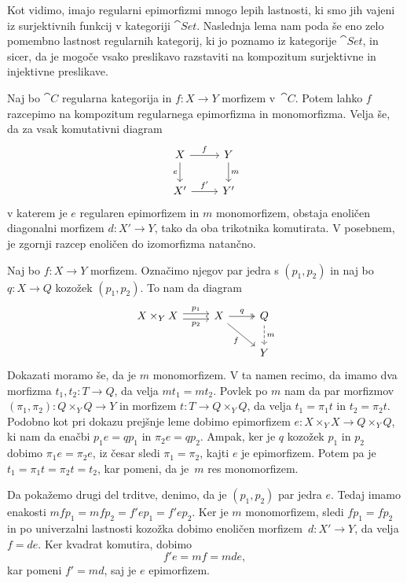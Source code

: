 \documentclass[../kategoricna_logika.tex]{subfiles}
\begin{document}
Kot vidimo, imajo regularni epimorfizmi mnogo lepih lastnosti, ki smo
jih vajeni iz surjektivnih funkcij v kategoriji $\cat{Set}$.
Naslednja lema nam poda še eno zelo pomembno lastnost regularnih
kategorij, ki jo poznamo iz kategorije $\cat{Set}$, in sicer, da je
mogoče vsako preslikavo razstaviti na kompozitum surjektivne in
injektivne preslikave.
\begin{lema}
  Naj bo $\cat{C}$ regularna kategorija in $f: X \to Y$ morfizem
  v~$\cat{C}$.  Potem lahko $f$ razcepimo na kompozitum regularnega
  epimorfizma in monomorfizma.  Velja še, da za vsak komutativni
  diagram
  \begin{equation*}
    \begin{tikzcd}
      X \ar[d, "e"'] \ar[r, "f"] & Y \ar[d, "m"] \\
      X' \ar[r, "f'"] & Y'
    \end{tikzcd}
  \end{equation*}
  v katerem je $e$ regularen epimorfizem in $m$ monomorfizem, obstaja
  enoličen diagonalni morfizem $d : X' \to Y$, tako da oba trikotnika
  komutirata.  V posebnem, je zgornji razcep enoličen do izomorfizma
  natančno.
\end{lema}
\begin{comment}
  \begin{opomba}
    Pokažimo, da zgornja trditev res pomeni, da so slike morfizmov
    enolične.
  \end{opomba}
\end{comment}
\begin{dokaz}
  Naj bo $f : X \to Y$ morfizem.  Označimo njegov par jedra s
  $(p_1, p_2)$ in naj bo$q : X \to Q$ kozožek $(p_1, p_2)$.  To nam da
  diagram
  \begin{equation*}
    \begin{tikzcd}
      X \times_Y X \ar[r, shift left, "p_1"] \ar[r, shift right,
      "p_2"'] &
      X \ar[dr, "f"'] \ar[r, two heads, "q"] & Q \ar[d, dashed, "m"] \\
      & & Y
    \end{tikzcd}
  \end{equation*}
  Dokazati moramo še, da je $m$ monomorfizem. V ta namen recimo, da
  imamo dva morfizma $t_1, t_2 : T \to Q$, da velja $m t_1 = m
  t_2$. Povlek po $m$ nam da par morfizmov
  $(\pi_1, \pi_2) : Q \times_Y Q \to Y$ in morfizem
  $t : T \to Q \times_Y Q$, da velja $t_1 = \pi_1 t$ in
  $t_2 = \pi_2 t$.  Podobno kot pri dokazu prejšnje leme dobimo
  epimorfizem $e : X \times_Y X \to Q \times_Y Q$, ki nam da enačbi
  $p_1 e = q p_1$ in $\pi_2 e = q p_2$.  Ampak, ker je $q$ kozožek
  $p_1$ in $p_2$ dobimo $\pi_1 e = \pi_2 e$, iz česar sledi
  $\pi_1 = \pi_2$, kajti $e$ je epimorfizem.  Potem pa je
  $t_1 = \pi_1 t = \pi_2 t = t_2$, kar pomeni, da je~$m$ res
  monomorfizem.

  Da pokažemo drugi del trditve, denimo, da je $(p_1, p_2)$ par jedra
  $e$.  Tedaj imamo enakosti
  $m f p_1 = m f p_2 = f' e p_1 = f' e p_2$.  Ker je $m$ monomorfizem,
  sledi $f p_1 = f p_2$ in po univerzalni lastnosti kozožka dobimo
  enoličen morfizem~$d : X' \to Y$, da velja $f = d e$. Ker kvadrat
  komutira, dobimo
  \[f' e = m f = m d e, \] kar pomeni $f' = m d$, saj je $e$
  epimorfizem.
\end{dokaz}
\end{document}
